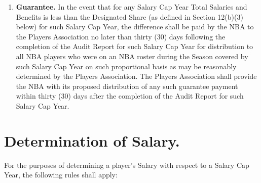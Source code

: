 \documentclass[
]{book}
\begin{document}
\begin{enumerate}
\begin{enumerate}
  \end{enumerate}
\item
  \textbf{Guarantee.} In the event that for any Salary Cap Year Total Salaries and Benefits is less than the Designated Share (as defined in Section 12(b)(3) below) for such Salary Cap Year, the difference shall be paid by the NBA to the Players Association no later than thirty (30) days following the completion of the Audit Report for such Salary Cap Year for distribution to all NBA players who were on an NBA roster during the Season covered by such Salary Cap Year on such proportional basis as may be reasonably determined by the Players Association. The Players Association shall provide the NBA with its proposed distribution of any such guarantee payment within thirty (30) days after the completion of the Audit Report for such Salary Cap Year.
\end{enumerate}

\hypertarget{determination-of-salary.}{%
\section{Determination of Salary.}\label{determination-of-salary.}}

For the purposes of determining a player's Salary with respect to a Salary Cap Year, the following rules shall apply:
\end{document}
